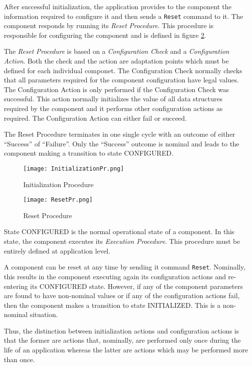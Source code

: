 \documentclass{pnp_article}
\begin{document}
After successful initialization, the application provides to the component the information required to configure it and then sends a \texttt{Reset} command to it. 
The component responds by running its \textit{Reset Procedure}. 
This procedure is responsible for configuring the component and is defined in figure  \ref{fig:ResetPr}.
 
The \textit{Reset Procedure} is based on a \textit{Configuration Check} and a \textit{Configuration Action}. 
Both the check and the action are adaptation points which must be defined for each individual componet. 
The Configuration Check normally checks that all parameters required for the component configuration have legal values. 
The Configuration Action is only performed if the Configuration Check was successful. 
This action normally initializes the value of all data structures required by the component and it performs other configuration actions as required. 
The Configuration Action can either fail or succeed.

The Reset Procedure terminates in one single cycle with an outcome of either “Success” of “Failure”. 
Only the “Success” outcome is nominal and leads to the component making a transition to state CONFIGURED.

\begin{figure}[ht]
 \centering
 \texttt{[image: InitializationPr.png]}
 \caption{Initialization Procedure}
 \label{fig:InitializationPr}
\end{figure}

\begin{figure}[ht]
 \centering
 \texttt{[image: ResetPr.png]}
 \caption{Reset Procedure}
 \label{fig:ResetPr}
\end{figure}


State CONFIGURED is the normal operational state of a component. 
In this state, the component executes its \textit{Execution Procedure}. 
This procedure must be entirely defined at application level. 

A component can be reset at any time by sending it command \texttt{Reset}. 
Nominally, this results in the component executing again its configuration actions and re-entering its CONFIGURED state. 
However, if any of the component parameters are found to have non-nominal values or if any of the configuration actions fail, then the component makes a transition to state INITIALIZED. 
This is a non-nominal situation.

Thus, the distinction between initialization actions and configuration actions is that the former are actions that, nominally, are performed only once during the life of an application whereas the latter are actions which may be performed more than once.
\end{document}
